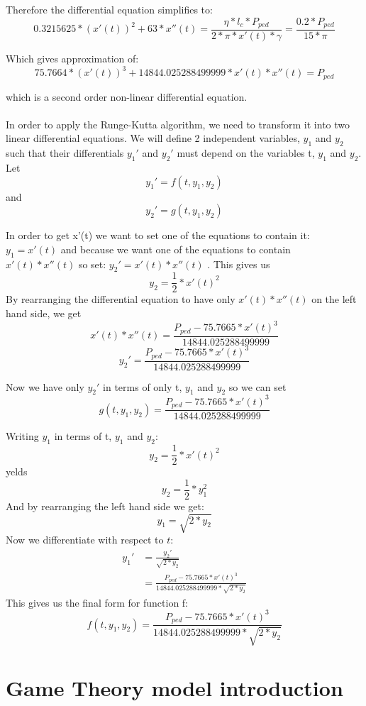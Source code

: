 \documentclass[10pt, a4paper]{report}
\begin{document}
Therefore the differential equation simplifies to:
$$ 0.3215625 * (x'(t))^{2} + 63 * x''(t)
	= \frac{\eta * l_{c} * P_{ped}} {2 * \pi * x'(t) * \gamma }
	= \frac {0.2 * P_{ped}} {15 * \pi} $$

Which gives approximation of:
$$ 75.7664 *(x'(t))^{3} + 14844.025288499999 * x'(t) * x''(t) = P_{ped}$$

which is a second order non-linear differential equation.\\\\
In order to apply the Runge-Kutta algorithm, we need to transform it into two linear differential equations. We will define 2 independent variables, $y_1$ and $y_2$ such that their differentials $y_1'$ and $y_2'$ must depend on the variables t, $y_1$ and $y_2$. Let
$$ y_1' = f( t, y_1, y_2 )$$ and $$y_2' = g( t, y_1, y_2 )$$

In order to get x'(t) we want to set one of the equations to contain it: $y_1 = x'(t)$ and because we want one of the equations to contain $x'(t) * x''(t) $ so set: $y_2' = x'( t ) * x''( t )$ .
This gives us $$ y_{2} = \frac{1}{2} * x'(t)^2 $$
By rearranging the differential equation to have only $ x'( t ) * x''( t )$ on the left hand side, we get
$$ x'( t ) * x''( t ) = \frac{P_{ped} - 75.7665 * x'( t ) ^ 3}{14844.025288499999}$$
$$ y_2' = \frac{P_{ped} - 75.7665 * x'( t ) ^ 3}{14844.025288499999}$$

Now we have only $y_2'$ in terms of only t, $y_1$ and $y_2$ so we can set $$ g( t, y_1, y_2 ) = \frac{P_{ped} - 75.7665 * x'( t ) ^ 3}{14844.025288499999}$$

Writing $y_1$ in terms of t, $y_1$ and $y_2$: $$y_2 = \frac{1}{2} * x'(t)^2$$ yelds $$y_2 = \frac{1}{2} * y_1^2$$
And by rearranging the left hand side we get:
$$y_1 = \sqrt{2 * y_2}$$
Now we differentiate with respect to $t$:
\begin{align*}
y_1' & = \frac{y_2'}{\sqrt{2 * y_2}}\\
& = \frac{P_{ped} - 75.7665 * x'( t ) ^ 3}{14844.025288499999 * \sqrt{2 * y_2}}
\end{align*}
This gives us the final form for function f:
$$ f(t, y_1, y_2) = \frac{P_{ped} - 75.7665 * x'( t ) ^ 3}{14844.025288499999 * \sqrt{2 * y_2}}$$


\section{Game Theory model introduction}
\end{document}
